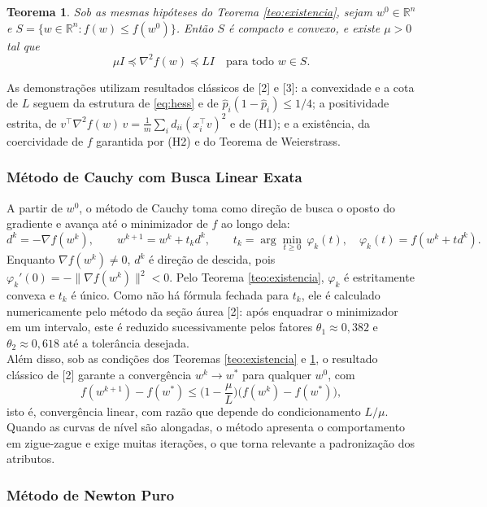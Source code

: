 \documentclass{article}
\newtheorem{theorem}{Teorema}
\theoremstyle{remark}
\begin{document}
\begin{theorem}\label{teo:nivel}
Sob as mesmas hipóteses do Teorema \ref{teo:existencia}, sejam $w^0 \in \mathbb{R}^n$ e $S = \{ w \in \mathbb{R}^n : f(w) \leq f(w^0) \}$. Então $S$ é compacto e convexo, e existe $\mu > 0$ tal que
\[
\mu I \preceq \nabla^2 f(w) \preceq L I \quad \text{para todo } w \in S.
\]
\end{theorem} 

As demonstrações utilizam resultados clássicos de [2] e [3]: a convexidade e a cota de $L$ seguem da estrutura de \eqref{eq:hess} e de $\hat p_i(1 - \hat p_i) \leq 1/4$; a positividade estrita, de $v^\top \nabla^2 f(w)\, v = \frac{1}{m} \sum_i d_{ii} (x_i^\top v)^2$ e de (H1); e a existência, da coercividade de $f$ garantida por (H2) e do Teorema de Weierstrass.

\subsubsection{Método de Cauchy com Busca Linear Exata}

A partir de $w^0$, o método de Cauchy toma como direção de busca o oposto do gradiente e avança até o minimizador de $f$ ao longo dela:
\[
d^k = -\nabla f(w^k), \qquad w^{k+1} = w^k + t_k d^k, \qquad t_k = \arg\min_{t \geq 0} \, \varphi_k(t), \quad \varphi_k(t) = f(w^k + t d^k).
\]
Enquanto $\nabla f(w^k) \neq 0$, $d^k$ é direção de descida, pois $\varphi_k'(0) = -\|\nabla f(w^k)\|^2 < 0$. Pelo Teorema \ref{teo:existencia}, $\varphi_k$ é estritamente convexa e $t_k$ é único. Como não há fórmula fechada para $t_k$, ele é calculado numericamente pelo método da seção áurea [2]: após enquadrar o minimizador em um intervalo, este é reduzido sucessivamente pelos fatores $\theta_1 \approx 0{,}382$ e $\theta_2 \approx 0{,}618$ até a tolerância desejada.\\

Além disso, sob as condições dos Teoremas \ref{teo:existencia} e \ref{teo:nivel}, o resultado clássico de [2] garante a convergência $w^k \to w^*$ para qualquer $w^0$, com
\[
f(w^{k+1}) - f(w^*) \leq \Big( 1 - \frac{\mu}{L} \Big) \big( f(w^k) - f(w^*) \big),
\]
isto é, convergência linear, com razão que depende do condicionamento $L/\mu$. Quando as curvas de nível são alongadas, o método apresenta o comportamento em zigue-zague e exige muitas iterações, o que torna relevante a padronização dos atributos.

\subsubsection{Método de Newton Puro}\label{subsubsec:newton}
\end{document}
